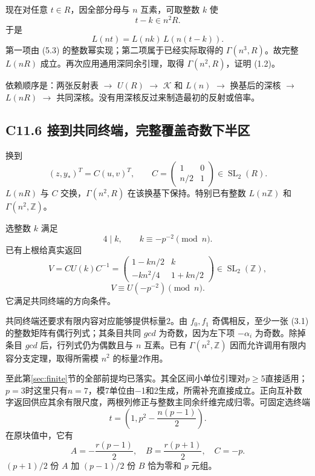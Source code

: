 {现在对任意} \(t\in R\){，因全部分母与} \(n\) {互素，可取整数} \(k\) {使} \[
t-k\in n^2R.
\] {于是} \[
L(nt)=L(nk)\,L(n(t-k)).
\] {第一项由} {(5.3)} {的整数幂实现；第二项属于已经实际取得的} \(\Gamma(n^3,R)\){。故完整} \(L(nR)\) {成立。再次应用通用深同余引理，取得} \(\Gamma(n^2,R)\){，证明} {(1.2)。}

{依赖顺序是：两张反射表} {\ensuremath{\to}} \(U(R)\) {\ensuremath{\to}} \(\mathcal K\) {和} \(L(n)\) {\ensuremath{\to}} {换基后的深核} {\ensuremath{\to}} \(L(nR)\) {\ensuremath{\to}} {共同深核。没有用深核反过来制造最初的反射或倍率。}

\subsection*{\texorpdfstring{{C11.6} {接到共同终端，完整覆盖奇数下半区}}{C11.6 接到共同终端，完整覆盖奇数下半区}}\label{C11-h83}

{换到} \[
(z,y_*)^T=C(u,v)^T,\qquad
C=\begin{pmatrix}1&0\\n/2&1\end{pmatrix}\in\operatorname{SL}_2(R).
\] \(L(nR)\) {与} \(C\) {交换，}\(\Gamma(n^2,R)\) {在该换基下保持。特别已有整数} \(L(n\mathbb Z)\) {和} \(\Gamma(n^2,\mathbb Z)\){。}

{选整数} \(k\) {满足} \[
4\mid k,\qquad k\equiv-p^{-2}\pmod n.
\] {已有上根给真实返回} \[
V=CU(k)C^{-1}
=\begin{pmatrix}
1-kn/2&k\\-kn^2/4&1+kn/2
\end{pmatrix}\in\operatorname{SL}_2(\mathbb Z),
\] \[
V\equiv U(-p^{-2})\pmod n.
\tag{C11.6.1}
\] {它满足共同终端的方向条件。}

{共同终端还要求有限内容对应能够提供标量2。由} \(f_0,f_1\) {奇偶相反，至少一张} {(3.1)} {的整数矩阵有偶行列式；其条目共同} {\ensuremath{gcd}} {为奇数，因为左下项} \(-\alpha_i\) {为奇数。除掉条目} {\ensuremath{gcd}} {后，行列式仍为偶数且与} \(n\) {互素。已有} \(\Gamma(n^2,\mathbb Z)\) {因而允许调用有限内容分支定理，取得所需模} \(n^2\) {的标量2作用。}

{至此}第\ref{sec:finite}节{的全部前提均已落实。其全区间小单位引理对\ensuremath{p}\ensuremath{\ge}5直接适用；\ensuremath{p=3}时这里只有\ensuremath{n=7}，模7单位由−1和2生成，所需补充直接成立。正向互补数字返回供应其余有限尺度，两根列修正与整数主同余纤维完成归零。可固定选终端} \[
t=\left(1,p^2-\frac{n(p-1)}2\right).
\] {在原块值中，它有} \[
A=-\frac{r(p-1)}2,\quad B=\frac{r(p+1)}2,\quad C=-p.
\] \((p+1)/2\) {份} \(A\) {加} \((p-1)/2\) {份} \(B\) {恰为零和} \(p\) {元组。}

